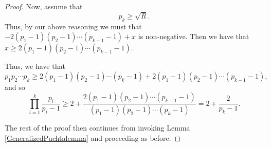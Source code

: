 \documentclass[10pt,a4paper]{amsart}
\begin{document}
\begin{proof}
Now, assume that $$p_k \geq  \sqrt{R}.$$ Thus, by our above reasoning we must that $-2(p_1-1)(p_2-1)\cdots(p_{k-1}-1) + x$  is non-negative. Then we have that $x \geq 2(p_1-1)(p_2-1)\cdots(p_{k-1}-1)$.

Thus, we have that
\begin{equation}p_1p_2 \cdots p_k  \geq  2(p_1-1)(p_2-1)\cdots (p_k-1) + 2(p_1-1)(p_2-1)\cdots(p_{k-1}-1) \label{Wegettousex},\end{equation}
and so
$$\prod_{i=1}^k \frac{p_i}{p_i-1} \geq 2 +\frac{2(p_1-1)(p_2-1)\cdots(p_{k-1}-1)}{(p_1-1)(p_2-1)\cdots(p_k-1)} =  2 + \frac{2}{p_k-1}.   $$

The rest of the proof then continues from invoking Lemma \ref{GeneralizedPuchtalemma} and proceeding as before. 
\end{proof}
\end{document}
